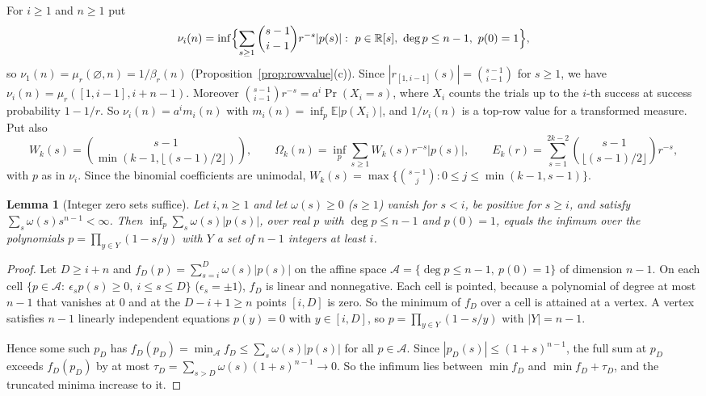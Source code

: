 \documentclass[11pt]{article}
\newtheorem{lemma}[theorem]{Lemma}
\newcommand{\R}{\mathbb R}
\begin{document}
For $i\ge1$ and $n\ge1$ put
\[
  \nu_i(n)=\inf\Bigl\{\sum_{s\ge1}\binom{s-1}{i-1}r^{-s}|p(s)|:\
  p\in\R[s],\ \deg p\le n-1,\ p(0)=1\Bigr\},
\]
so $\nu_1(n)=\mu_r(\varnothing,n)=1/\beta_r(n)$ (Proposition~\ref{prop:rowvalue}(c)).  Since
$|r_{[1,i-1]}(s)|=\binom{s-1}{i-1}$ for $s\ge1$, we have
$\nu_i(n)=\mu_r([1,i-1],i+n-1)$.  Moreover
$\binom{s-1}{i-1}r^{-s}=a^i\Pr(X_i=s)$, where $X_i$ counts the trials up to
the $i$-th success at success probability $1-1/r$.  So
$\nu_i(n)=a^im_i(n)$ with $m_i(n)=\inf_p\mathbb E|p(X_i)|$, and
$1/\nu_i(n)$ is a top-row value for a transformed measure.  Put also
\[
  W_k(s)=\binom{s-1}{\min(k-1,\lfloor(s-1)/2\rfloor)},\qquad
  \Omega_k(n)=\inf_p\sum_{s\ge1}W_k(s)r^{-s}|p(s)|,\qquad
  E_k(r)=\sum_{s=1}^{2k-2}\binom{s-1}{\lfloor(s-1)/2\rfloor}r^{-s},
\]
with $p$ as in $\nu_i$.  Since the binomial coefficients are unimodal,
$W_k(s)=\max\{\binom{s-1}j:0\le j\le\min(k-1,s-1)\}$.

\begin{lemma}[Integer zero sets suffice]\label{lem:intzeros}
Let $i,n\ge1$ and let $\omega(s)\ge0$ ($s\ge1$) vanish for $s<i$, be
positive for $s\ge i$, and satisfy $\sum_s\omega(s)s^{n-1}<\infty$.  Then
$\inf_p\sum_s\omega(s)|p(s)|$, over real $p$ with $\deg p\le n-1$ and
$p(0)=1$, equals the infimum over the polynomials
$p=\prod_{y\in Y}(1-s/y)$ with $Y$ a set of $n-1$ integers at least $i$.
\end{lemma}

\begin{proof}
Let $D\ge i+n$ and $f_D(p)=\sum_{s=i}^D\omega(s)|p(s)|$ on the affine space
$\mathcal A=\{\deg p\le n-1,\ p(0)=1\}$ of dimension $n-1$.  On each cell
$\{p\in\mathcal A:\ \epsilon_sp(s)\ge0,\ i\le s\le D\}$
($\epsilon_s=\pm1$), $f_D$ is linear and nonnegative.  Each cell is
pointed, because a polynomial of degree at most $n-1$ that vanishes at $0$
and at the $D-i+1\ge n$ points $[i,D]$ is zero.  So the minimum of $f_D$ over
a cell is attained at a vertex.  A vertex satisfies $n-1$ linearly
independent equations $p(y)=0$ with $y\in[i,D]$, so
$p=\prod_{y\in Y}(1-s/y)$ with $|Y|=n-1$.

Hence some such $p_D$ has $f_D(p_D)=\min_{\mathcal A}f_D\le
\sum_s\omega(s)|p(s)|$ for all $p\in\mathcal A$.  Since
$|p_D(s)|\le(1+s)^{n-1}$, the full sum at $p_D$ exceeds $f_D(p_D)$ by at
most $\tau_D=\sum_{s>D}\omega(s)(1+s)^{n-1}\to0$.  So the infimum lies
between $\min f_D$ and $\min f_D+\tau_D$, and the truncated minima increase
to it.
\end{proof}
\end{document}
